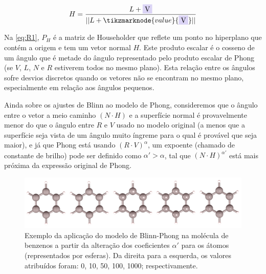 \begin{figure}[htb]
\begin{equation}
    \label{eq:R1}
    H = \frac{L + \highlight{blue}{V} }{||L + \tikzmarknode{value}{\highlight{blue}{V}}||}
\end{equation}
\vspace{2\baselineskip}
\end{figure}

Na \autoref{eq:R1}, $P_H$ é a matriz de Householder que reflete um ponto no hiperplano que contém a origem e tem um vetor normal $H$. Este produto escalar é o cosseno de um ângulo que é metade do ângulo representado pelo produto escalar de Phong (se $V$, $L$, $N$ e $R$ estiverem todos no mesmo plano). Esta relação entre os ângulos sofre desvios discretos quando os vetores não se encontram no mesmo plano, especialmente em relação aos ângulos pequenos.

Ainda sobre os ajustes de Blinn ao modelo de Phong, consideremos que o ângulo entre o vetor a meio caminho $(N \cdot H)$ e a superfície normal é provavelmente menor do que o ângulo entre $R$ e $V$ usado no modelo original (a menos que a superfície seja vista de um ângulo muito íngreme para o qual é provável que seja maior), e já que Phong está usando $(R \cdot V)^\alpha$, um expoente (chamado de constante de brilho) pode ser definido como $\alpha' > \alpha$, tal que $(N \cdot H)^{\alpha'}$ está mais próxima da expressão original de Phong.

\begin{figure}[htb]
\caption{\label{fig:representations} Exemplo da aplicação do modelo de Blinn-Phong na molécula de benzenos a partir da alteração dos coeficientes $\alpha'$ para os átomos (representados por esferas). Da direita para a esquerda, os valores atribuídos foram: 0, 10, 50, 100, 1000; respectivamente.}
	\begin{center}
		\includegraphics[width=1.0\textwidth]{images/shininess(1).png}
	\end{center}
\end{figure}

